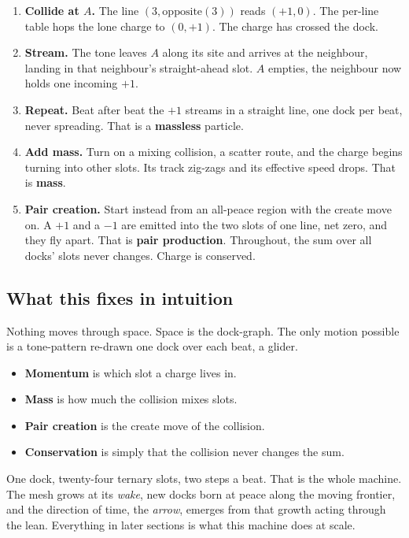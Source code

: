 \begin{enumerate}
\item \textbf{Collide at $A$.} The line $(3, \mathrm{opposite}(3))$ reads $(+1, 0)$. The per-line table hops the lone charge to $(0, +1)$. The charge has crossed the dock.
\item \textbf{Stream.} The tone leaves $A$ along its site and arrives at the neighbour, landing in that neighbour's straight-ahead slot. $A$ empties, the neighbour now holds one incoming $+1$.
\item \textbf{Repeat.} Beat after beat the $+1$ streams in a straight line, one dock per beat, never spreading. That is a \textbf{massless} particle.
\item \textbf{Add mass.} Turn on a mixing collision, a scatter route, and the charge begins turning into other slots. Its track zig-zags and its effective speed drops. That is \textbf{mass}.
\item \textbf{Pair creation.} Start instead from an all-peace region with the create move on. A $+1$ and a $-1$ are emitted into the two slots of one line, net zero, and they fly apart. That is \textbf{pair production}. Throughout, the sum over all docks' slots never changes. Charge is conserved.
\end{enumerate}

\subsection{What this fixes in intuition}

Nothing moves through space. Space is the dock-graph. The only motion possible is a tone-pattern re-drawn one dock over each beat, a glider.

\begin{itemize}
\item \textbf{Momentum} is which slot a charge lives in.
\item \textbf{Mass} is how much the collision mixes slots.
\item \textbf{Pair creation} is the create move of the collision.
\item \textbf{Conservation} is simply that the collision never changes the sum.
\end{itemize}

One dock, twenty-four ternary slots, two steps a beat. That is the whole machine. The mesh grows at its \emph{wake}, new docks born at peace along the moving frontier, and the direction of time, the \emph{arrow}, emerges from that growth acting through the lean. Everything in later sections is what this machine does at scale.
